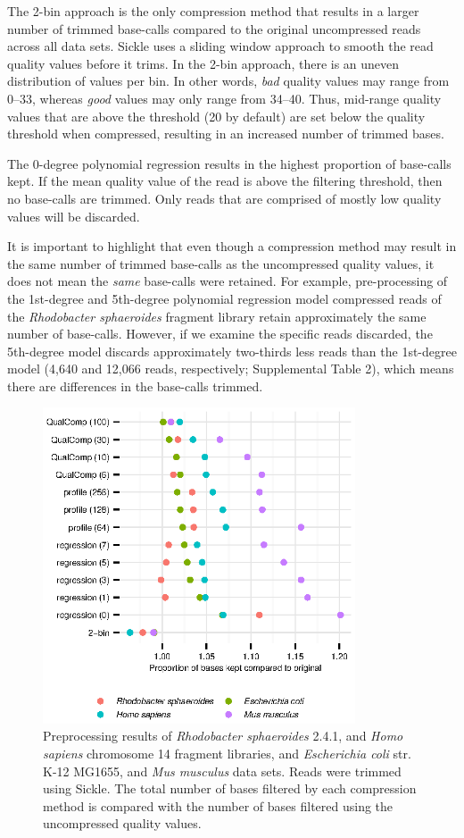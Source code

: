 \documentclass{bioinfo}
\begin{document}
The 2-bin approach is the only compression method that results in a
larger number of trimmed base-calls compared to the original
uncompressed reads across all data sets. Sickle uses a sliding window
approach to smooth the read quality values before it trims. In the
2-bin approach, there is an uneven distribution of values per bin. In
other words, \emph{bad} quality values may range from 0--33, whereas
\emph{good} values may only range from 34--40. Thus, mid-range quality
values that are above the threshold (20 by default) are set below the
quality threshold when compressed, resulting in an increased number of
trimmed bases.

The 0-degree polynomial regression results in the highest proportion
of base-calls kept. If the mean quality value of the read is above the
filtering threshold, then no base-calls are trimmed. Only reads that
are comprised of mostly low quality values will be discarded.

It is important to highlight that even though a compression method may
result in the same number of trimmed base-calls as the uncompressed
quality values, it does not mean the \emph{same} base-calls were
retained.  For example, pre-processing of the 1st-degree and
5th-degree polynomial regression model compressed reads of the
\textit{Rhodobacter sphaeroides} fragment library retain approximately
the same number of base-calls. However, if we examine the specific
reads discarded, the 5th-degree model discards approximately
two-thirds less reads than the 1st-degree model (4,640 and 12,066
reads, respectively; Supplemental Table 2), which means there are
differences in the base-calls trimmed.

\begin{figure}[!tbp]
\centerline{\includegraphics[width=3.65in]{preprocessing_results.eps}}
\caption{Preprocessing results of \textit{Rhodobacter sphaeroides}
  2.4.1, and \textit{Homo sapiens} chromosome 14 fragment libraries,
  and \textit{Escherichia coli} str. K-12 MG1655, and \textit{Mus
    musculus} data sets. Reads were trimmed using Sickle. The total
  number of bases filtered by each compression method is compared with
  the number of bases filtered using the uncompressed quality values.}
  \label{fig:preprocessing}
\end{figure}
\end{document}

